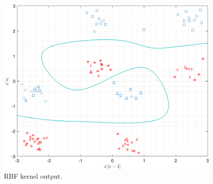 \documentclass[11pt]{article}
\begin{document}
\begin{figure}[h!]
    \centering
    \includegraphics[width=\textwidth]{figure03.png}
    \caption{RBF kernel output.}
    \label{fig:rbf}
\end{figure}
\end{document}
